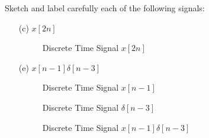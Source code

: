 \documentclass[fleqn]{article}
\begin{document}
\begin{enumerate}[nolistsep]
		Sketch and label carefully each of the following signals:
		
		\begin{enumerate}[nolistsep]
			\item[(c)] $x[2n]$
			
			
			\begin{figure}[H]				
			\centerline{}
		\caption{Discrete Time Signal $x[2n]$}
		\label{part_c}
		\end{figure}
		
			\item[(e)] $x[n - 1]\delta[n - 3]$
			
			\begin{figure}[H]
			\centerline{}
		\caption{Discrete Time Signal $x[n-1]$}
		\label{part_e_x_nm1}
		\end{figure}
			
			\begin{figure}[H]
			\centerline{}
		\caption{Discrete Time Signal $\delta[n-3]$}
		\label{part_e_delta_nm3}
		\end{figure}
		
		\begin{figure}[H]
			\centerline{}
		\caption{Discrete Time Signal $x[n-1]\delta[n-3]$}
		\label{part_e}
		\end{figure}
		

\end{enumerate}
\end{enumerate}
\end{document}
